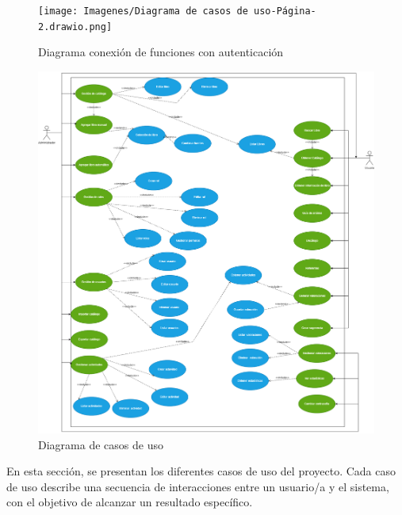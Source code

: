\begin{figure}[htbp]
    \centering
    \texttt{[image: Imagenes/Diagrama de casos de uso-Página-2.drawio.png]}
    \caption{Diagrama conexión de funciones con autenticación}
    \label{Diagrama conexión de funciones con autenticación}
\end{figure}
\FloatBarrier

\begin{figure}[htbp]
    \centering
    \includegraphics[width=\linewidth]{Imagenes/Diagrama de casos de uso.drawio.png}
    \caption{Diagrama de casos de uso}
    \label{Diagrama de casos de uso}
\end{figure}
\FloatBarrier
En esta sección, se presentan los diferentes casos de uso del proyecto. Cada caso de uso describe una secuencia de interacciones entre un usuario/a y el sistema, con el objetivo de alcanzar un resultado específico.
